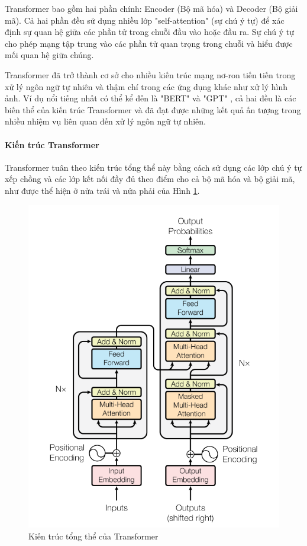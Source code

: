 Transformer bao gồm hai phần chính: Encoder (Bộ mã hóa) và Decoder (Bộ giải mã). Cả hai phần đều sử dụng nhiều lớp "self-attention" (sự chú ý tự) để xác định sự quan hệ giữa các phần tử trong chuỗi đầu vào hoặc đầu ra. Sự chú ý tự cho phép mạng tập trung vào các phần tử quan trọng trong chuỗi và hiểu được mối quan hệ giữa chúng.

Transformer đã trở thành cơ sở cho nhiều kiến trúc mạng nơ-ron tiến tiến trong xử lý ngôn ngữ tự nhiên và thậm chí trong các ứng dụng khác như xử lý hình ảnh. Ví dụ nổi tiếng nhất có thể kể đến là "BERT" và "GPT" , cả hai đều là các biến thể của kiến trúc Transformer và đã đạt được những kết quả ấn tượng trong nhiều nhiệm vụ liên quan đến xử lý ngôn ngữ tự nhiên.

\paragraph{Kiến trúc Transformer}
Transformer tuân theo kiến trúc tổng thể này bằng cách sử dụng các lớp chú ý tự xếp chồng và các lớp kết nối đầy đủ theo điểm cho cả bộ mã hóa và bộ giải mã, như được thể hiện ở nửa trái và nửa phải của Hình \ref{fig3}. 
\begin{figure}[h]
    \includegraphics[scale=0.65]{images/transformer-architecture.png}
    \centering
    \caption{Kiến trúc tổng thể của Transformer \cite{vaswani2023attention}}
    \label{fig3}
\end{figure}

